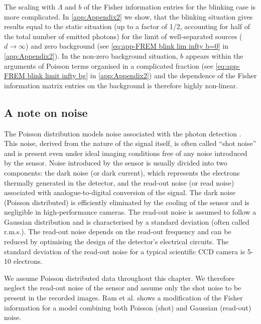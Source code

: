 The scaling with $\Lambda$ and $b$ of the Fisher information entries for the blinking case is more complicated. In \autoref{app:Appendix2} we show, that the blinking situation gives results equal to the static situation (up to a factor of 1/2, accounting for half of the total number of emitted photons) for the limit of well-separated sources ($d\rightarrow\infty$) and zero background (see \autoref{eq:app-FREM blink lim infty b=0} in \autoref{app:Appendix2}). In the non-zero background situation, $b$ appears within the arguments of Poisson terms organised in a complicated fraction (see \autoref{eq:app-FREM blink limit infty bg} in \autoref{app:Appendix2}) and the dependence of the Fisher information matrix entries on the background is therefore highly non-linear.  


\subsection{A note on noise\label{sub:noise}}

The Poisson distribution models noise associated with the photon detection \cite{PawleyHandbook2006}. This noise, derived from the nature of the signal itself, is often called ``shot noise'' and is present even under ideal imaging conditions free of any noise introduced by the sensor. Noise introduced by the sensor is usually divided into two components: the dark noise (or dark current), which represents the electrons thermally generated in the detector, and the read-out noise (or read noise) associated with analogue-to-digital conversion of the signal. The dark noise (Poisson distributed) is efficiently eliminated by the cooling of the sensor and is negligible in high-performance cameras.  The read-out noise is assumed to follow a Gaussian distribution and is characterised by a standard deviation (often called r.m.s.).  The read-out noise depends on the read-out frequency and can be reduced by optimising the design of the detector's electrical circuits. The standard deviation of the read-out noise for a typical scientific CCD camera is 5-10 electrons. 

We assume Poisson distributed data throughout this chapter. We therefore neglect the read-out noise of the sensor and assume only the shot noise to be present in the recorded images. Ram et al. \cite{Ram2006} shows a modification of the Fisher information for a model combining both Poisson (shot) and Gaussian (read-out) noise.

